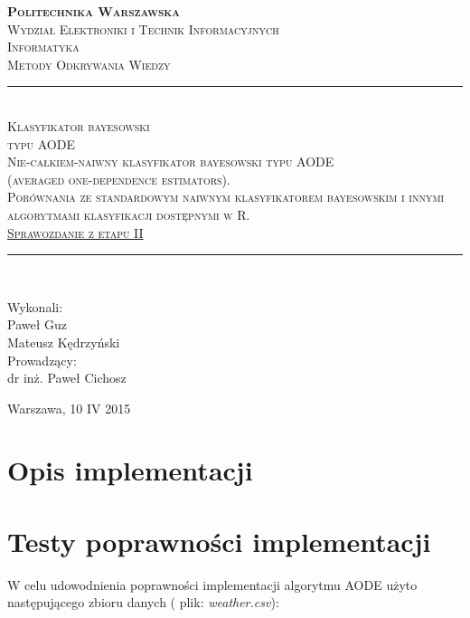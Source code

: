 \documentclass[16]{article}
\begin{document}
	\begin{titlepage}
		\begin{center}
			\vspace*{0cm}
			\textsc{\LARGE \bfseries Politechnika Warszawska}\\[1.5cm]
			\textsc{\large Wydział Elektroniki i Technik Informacyjnych}\\[0.2cm]
			\textsc{\large Informatyka}\\[1.6cm]
			\textsc{\LARGE Metody Odkrywania Wiedzy }\\[1.4cm]
			\rule{\linewidth}{0.5mm} \\ [0.8cm]
      \textsc{\Huge Klasyfikator bayesowski} \\ [0.4cm]
			\textsc{\Huge typu AODE} \\ [0.8cm]
			\textsc{\large Nie-całkiem-naiwny klasyfikator bayesowski typu AODE \\ (averaged one-dependence estimators). \\ Porównania ze standardowym naiwnym klasyfikatorem bayesowskim i innymi algorytmami klasyfikacji dostępnymi w R.} \\ [0.8cm]
			\textsc{\LARGE{\underline {Sprawozdanie z etapu II}}} \\ [0.8cm]
			\rule{\linewidth}{0.5mm} \\ [1cm]
			
			\begin{flushright}
				Wykonali: \\[0.2cm]
				{\large Paweł Guz}\\[0.2cm]
				{\large Mateusz Kędrzyński}\\[0.8cm]
				Prowadzący: \\[0.2cm]
				{\large dr inż. Paweł Cichosz} \\ [0.8cm]
			\end{flushright}
			\vfill
			{\large Warszawa, 10 IV 2015}
		\end{center}
	\end{titlepage}
	
\section{Opis implementacji}


\section{Testy poprawności implementacji}
W celu udowodnienia poprawności implementacji algorytmu AODE użyto następującego zbioru danych ( plik: \textit{weather.csv}):
\end{document}
